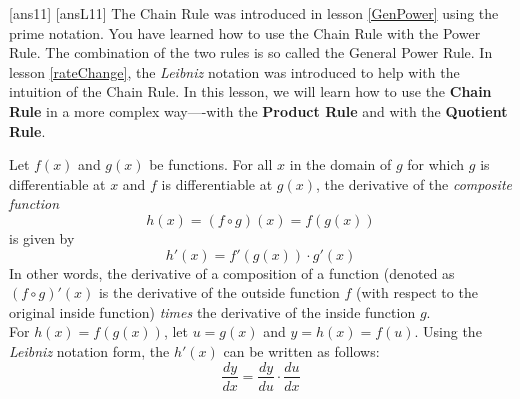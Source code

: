 

\newpage
[ans11]
[ansL11]
\noindent The Chain Rule was introduced in lesson \ref{GenPower} using the prime notation. You have learned how to use the Chain Rule with the Power Rule. The combination of the two rules is so called the General Power Rule. In lesson \ref{rateChange}, the \emph{Leibniz} notation was introduced to help with the intuition of the Chain Rule. In this lesson, we will learn how to use the \textbf{Chain Rule} in a more complex way----with the \textbf{Product Rule} and with the \textbf{Quotient Rule}.
\begin{tcolorbox}[title = {Review: The Chain Rule}]

\noindent Let $f(x)$ and $g(x)$ be functions. For all $x$ in the domain of $g$ for which $g$ is differentiable at $x$ and $f$ is differentiable at $g(x)$, the derivative of the \emph{composite function} \\
\begin{equation}
    h(x)=(f\circ g)(x)=f(g(x))
\end{equation}
is given by
\begin{equation}\label{eq:MoreChainRule}
    h'(x)=f'(g(x))\cdot g'(x)
\end{equation}
\noindent In other words, the derivative of a composition of a function (denoted as \((f\circ g)'(x)\) is the derivative of the outside function $f$ (with respect to the original inside function) \emph{times} the derivative of the inside function $g$.\\

For $h(x)=f(g(x))$, let $u=g(x)$ and $y=h(x)=f(u)$. Using the \emph{Leibniz} notation form, the $h'(x)$ can be written as follows:\\
\begin{equation}\label{eq:LeibnizChain}
    \displaystyle\frac{dy}{dx}=\frac{dy}{du}\cdot \frac{du}{dx}
\end{equation}
\end{tcolorbox}
